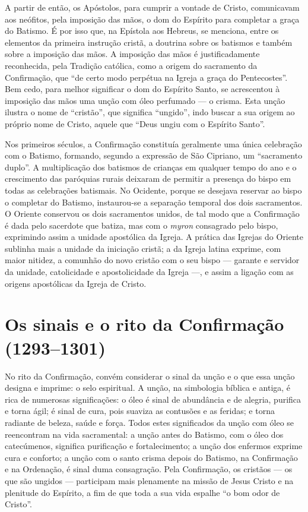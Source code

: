 A partir de então, os Apóstolos, para cumprir a vontade de Cristo, comunicavam aos neófitos, pela imposição das mãos, o dom do Espírito para completar a graça do Batismo. É por isso que, na Epístola aos Hebreus, se menciona, entre os elementos da primeira instrução cristã, a doutrina sobre os batismos e também sobre a imposição das mãos. A imposição das mãos é justificadamente reconhecida, pela Tradição católica, como a origem do sacramento da Confirmação, que ``de certo modo perpétua na Igreja a graça do Pentecostes''. Bem cedo, para melhor significar o dom do Espírito Santo, se acrescentou à imposição das mãos uma unção com óleo perfumado --- o crisma. Esta unção ilustra o nome de ``cristão'', que significa ``ungido'', indo buscar a sua origem ao próprio nome de Cristo, aquele que ``Deus ungiu com o Espírito Santo''.

Nos primeiros séculos, a Confirmação constituía geralmente uma única celebração com o Batismo, formando, segundo a expressão de São Cipriano, um ``sacramento duplo''. A multiplicação dos batismos de crianças em qualquer tempo do ano e o crescimento das paróquias rurais deixaram de permitir a presença do bispo em todas as celebrações batismais. No Ocidente, porque se desejava reservar ao bispo o completar do Batismo, instaurou-se a separação temporal dos dois sacramentos. O Oriente conservou os dois sacramentos unidos, de tal modo que a Confirmação é dada pelo sacerdote que batiza, mas com o \emph{myron} consagrado pelo bispo, exprimindo assim a unidade apostólica da Igreja. A prática das Igrejas do Oriente sublinha mais a unidade da iniciação cristã; a da Igreja latina exprime, com maior nitidez, a comunhão do novo cristão com o seu bispo --- garante e servidor da unidade, catolicidade e apostolicidade da Igreja ---, e assim a ligação com as origens apostólicas da Igreja de Cristo.

\section{Os sinais e o rito da Confirmação (1293--1301)}

No rito da Confirmação, convém considerar o sinal da unção e o que essa unção designa e imprime: o selo espiritual. A unção, na simbologia bíblica e antiga, é rica de numerosas significações: o óleo é sinal de abundância e de alegria, purifica e torna ágil; é sinal de cura, pois suaviza as contusões e as feridas; e torna radiante de beleza, saúde e força. Todos estes significados da unção com óleo se reencontram na vida sacramental: a unção antes do Batismo, com o óleo dos catecúmenos, significa purificação e fortalecimento; a unção dos enfermos exprime cura e conforto; a unção com o santo crisma depois do Batismo, na Confirmação e na Ordenação, é sinal duma consagração. Pela Confirmação, os cristãos --- os que são ungidos --- participam mais plenamente na missão de Jesus Cristo e na plenitude do Espírito, a fim de que toda a sua vida espalhe ``o bom odor de Cristo''.

